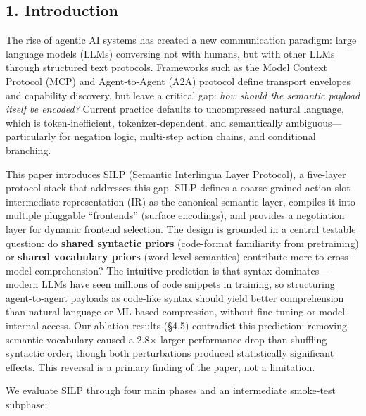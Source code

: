 \subsection{1. Introduction}\label{introduction}



The rise of agentic AI systems has created a new communication paradigm: large language models (LLMs) conversing not with humans, but with other LLMs through structured text protocols. Frameworks such as the Model Context Protocol (MCP) and Agent-to-Agent (A2A) protocol define transport envelopes and capability discovery, but leave a critical gap: \emph{how should the semantic payload itself be encoded?} Current practice defaults to uncompressed natural language, which is token-inefficient, tokenizer-dependent, and semantically ambiguous---particularly for negation logic, multi-step action chains, and conditional branching.



This paper introduces SILP (Semantic Interlingua Layer Protocol), a five-layer protocol stack that addresses this gap. SILP defines a coarse-grained action-slot intermediate representation (IR) as the canonical semantic layer, compiles it into multiple pluggable ``frontends'' (surface encodings), and provides a negotiation layer for dynamic frontend selection. The design is grounded in a central testable question: do \textbf{shared syntactic priors} (code-format familiarity from pretraining) or \textbf{shared vocabulary priors} (word-level semantics) contribute more to cross-model comprehension? The intuitive prediction is that syntax dominates---modern LLMs have seen millions of code snippets in training, so structuring agent-to-agent payloads as code-like syntax should yield better comprehension than natural language or ML-based compression, without fine-tuning or model-internal access. Our ablation results (§4.5) contradict this prediction: removing semantic vocabulary caused a 2.8× larger performance drop than shuffling syntactic order, though both perturbations produced statistically significant effects. This reversal is a primary finding of the paper, not a limitation.



We evaluate SILP through four main phases and an intermediate smoke-test subphase:



